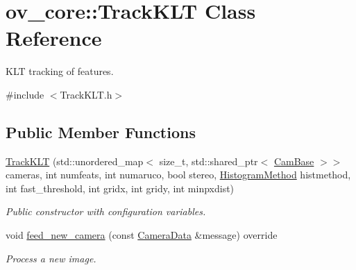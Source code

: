 \hypertarget{classov__core_1_1TrackKLT}{}\section{ov\+\_\+core\+:\+:Track\+K\+LT Class Reference}
\label{classov__core_1_1TrackKLT}


K\+LT tracking of features.  




{\ttfamily \#include $<$Track\+K\+L\+T.\+h$>$}

\subsection*{Public Member Functions}
\begin{DoxyCompactItemize}
\item 
\hyperlink{classov__core_1_1TrackKLT_acb59382fb0893c546e612fa20ca0672b}{Track\+K\+LT} (std\+::unordered\+\_\+map$<$ size\+\_\+t, std\+::shared\+\_\+ptr$<$ \hyperlink{classov__core_1_1CamBase}{Cam\+Base} $>$$>$ cameras, int numfeats, int numaruco, bool stereo, \hyperlink{classov__core_1_1TrackBase_aa4b34a5dce99b59522d57bf9278c9a1a}{Histogram\+Method} histmethod, int fast\+\_\+threshold, int gridx, int gridy, int minpxdist)
\begin{DoxyCompactList}\small\item\em Public constructor with configuration variables. \end{DoxyCompactList}\item 
void \hyperlink{classov__core_1_1TrackKLT_a8cb9c3595fbbddc9a563137cd06b07cf}{feed\+\_\+new\+\_\+camera} (const \hyperlink{structov__core_1_1CameraData}{Camera\+Data} \&message) override
\begin{DoxyCompactList}\small\item\em Process a new image. \end{DoxyCompactList}\end{DoxyCompactItemize}
